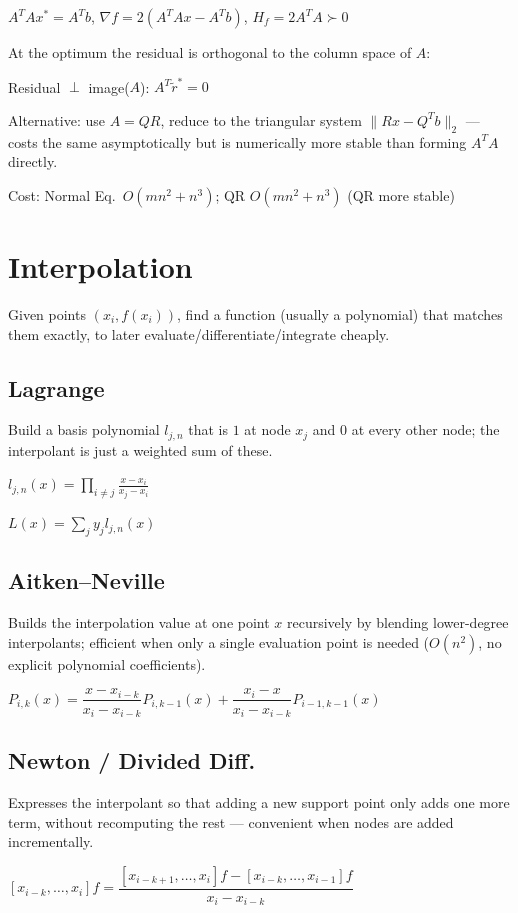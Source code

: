\documentclass[11pt]{extarticle}
\begin{document}
$A^TAx^*=A^Tb$, \quad $\nabla f=2(A^TAx-A^Tb)$, $H_f=2A^TA\succ0$

At the optimum the residual is orthogonal to the column space of $A$:

Residual $\perp$ image($A$): $A^T\tilde r^*=0$

Alternative: use $A=QR$, reduce to the triangular system $\|Rx-Q^Tb\|_2$ --- costs the same asymptotically but is numerically more stable than forming $A^TA$ directly.

Cost: Normal Eq.\ $O(mn^2{+}n^3)$; QR $O(mn^2{+}n^3)$ (QR more stable)

\section{Interpolation}
Given points $(x_i,f(x_i))$, find a function (usually a polynomial) that matches them exactly, to later evaluate/differentiate/integrate cheaply.

\subsection{Lagrange}
Build a basis polynomial $l_{j,n}$ that is $1$ at node $x_j$ and $0$ at every other node; the interpolant is just a weighted sum of these.

$l_{j,n}(x)=\displaystyle\prod_{i\ne j}\frac{x-x_i}{x_j-x_i}$

$L(x)=\sum_j y_jl_{j,n}(x)$

\subsection{Aitken--Neville}
Builds the interpolation value at one point $x$ recursively by blending lower-degree interpolants; efficient when only a single evaluation point is needed ($O(n^2)$, no explicit polynomial coefficients).

$P_{i,k}(x)=\dfrac{x-x_{i-k}}{x_i-x_{i-k}}P_{i,k-1}(x)+\dfrac{x_i-x}{x_i-x_{i-k}}P_{i-1,k-1}(x)$

\subsection{Newton / Divided Diff.}
Expresses the interpolant so that adding a new support point only adds one more term, without recomputing the rest --- convenient when nodes are added incrementally.

$[x_{i-k},\dots,x_i]f=\dfrac{[x_{i-k+1},\dots,x_i]f-[x_{i-k},\dots,x_{i-1}]f}{x_i-x_{i-k}}$
\end{document}
